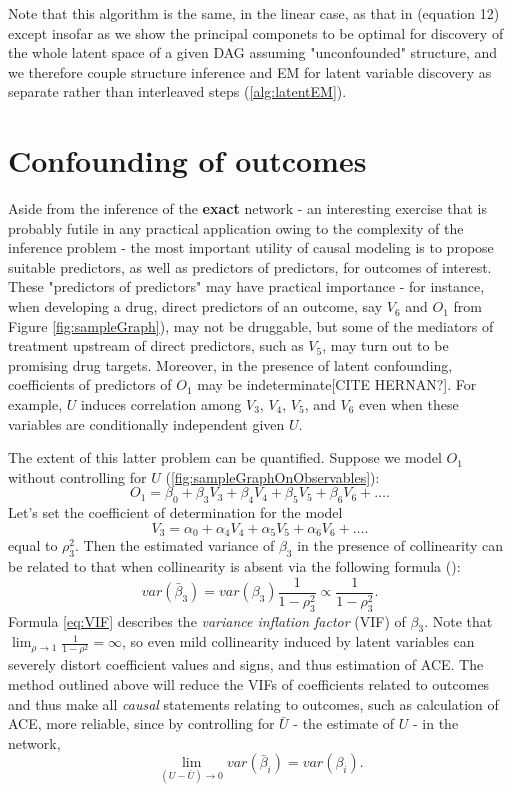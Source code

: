 \documentclass{article}
\begin{document}
Note that this algorithm is the same, in the linear case, as that in \cite{elidan_ideal_2007} (equation 12) except insofar as we show the principal componets to be optimal for discovery of the whole latent space of a given DAG assuming "unconfounded" structure, and we therefore couple structure inference and EM for latent variable discovery as separate rather than interleaved steps (\ref{alg:latentEM}).

\section{Confounding of outcomes}
Aside from the inference of the \textbf{exact} network - an interesting exercise that is probably futile in any practical application owing to the complexity of the inference problem - the most important utility of causal modeling is to propose suitable predictors, as well as predictors of predictors, for outcomes of interest.  These "predictors of predictors" may have practical importance - for instance, when developing a drug, direct predictors of an outcome, say $V_6$ and $O_1$ from Figure \ref{fig:sampleGraph}), may not be druggable, but some of the mediators of treatment upstream of direct predictors, such as $V_5$, may turn out to be promising drug targets.  Moreover, in the presence of latent confounding, coefficients of predictors of $O_1$ may be indeterminate[CITE HERNAN?].  For example, $U$ induces correlation among $V_3$, $V_4$, $V_5$, and $V_6$ even when these variables are conditionally independent given $U$.  

The extent of this latter problem can be quantified.  Suppose we model $O_1$ without controlling for $U$ (\ref{fig:sampleGraphOnObservables}): $$O_1 = \beta_0 + \beta_3 V_3 + \beta_4 V_4 + \beta_5 V_5 + \beta_6 V_6 + \dots.$$  Let's set the coefficient of determination for the model $$V_3 = \alpha_0 + \alpha_4 V_4 + \alpha_5 V_5 + \alpha_6 V_6 + \dots.$$ equal to $\rho_3^2$.  Then the estimated variance of $\beta_3$ in the presence of collinearity can be related to that when collinearity is absent via the following formula (\cite{rawlings_applied_1998}):
\begin{equation}
var(\bar{\beta}_3) = var(\beta_3) \frac{1}{1-\rho_3^2} \propto \frac{1}{1-\rho_3^2}.
\label{eq:VIF}
\end{equation}
Formula \ref{eq:VIF} describes the \textit{variance inflation factor} (VIF) of $\beta_3$.  Note that $\lim_{\rho \to 1} \frac{1}{1-\rho^2} = \infty$, so even mild collinearity induced by latent variables can severely distort coefficient values and signs, and thus estimation of ACE.  The method outlined above will reduce the VIFs of coefficients related to outcomes and thus make all \textit{causal} statements relating to outcomes, such as calculation of ACE, more reliable, since by controlling for $\bar{U}$ - the estimate of $U$ - in the network,
\begin{equation}
\lim_{(U - \bar{U})\to0} var(\bar{\beta}_i) = var(\beta_i).
\label{eq:vifImprovement}
\end{equation}
\end{document}
